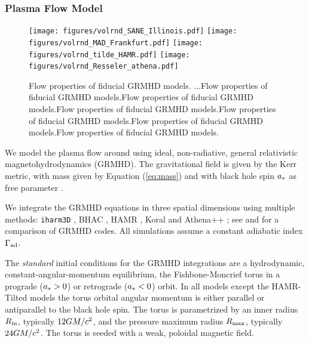 \subsubsection{Plasma Flow Model}

\begin{figure}
  \centering
  \texttt{[image: figures/volrnd\_SANE\_Illinois.pdf]}%
  \texttt{[image: figures/volrnd\_MAD\_Frankfurt.pdf]}%
  \texttt{[image: figures/volrnd\_tilde\_HAMR.pdf]}%
  \texttt{[image: figures/volrnd\_Resseler\_athena.pdf]}\\
  \caption{Flow properties of fiducial GRMHD models.
    ...Flow properties of fiducial GRMHD models.Flow properties of fiducial GRMHD models.Flow properties of fiducial GRMHD models.Flow properties of fiducial GRMHD models.Flow properties of fiducial GRMHD models.Flow properties of fiducial GRMHD models.}
  \label{fig:GRMHD}
\end{figure}

We model the plasma flow around \sgra using ideal, non-radiative, general relativistic magnetohydrodynamics (GRMHD).  The gravitational field is given by the Kerr metric, with mass given by Equation (\ref{eq:mass}) and with black hole spin $a_*$ as free parameter \citep[see e.g.,][]{2003ApJ...589..444G, 2005ApJ...635..723A, 2007A&A...473...11D}.

We integrate the GRMHD equations in three spatial dimensions using multiple methods: {\tt iharm3D} \citep{2021JOSS....6.3336P}, BHAC \citep{2017ComAC...4....1P}, HAMR \citep{2018MNRAS.474L..81L}, Koral \citep{2013MNRAS.429.3533S} and Athena++ \citep{2016ApJS..225...22W}; see \citealt{2019ApJS..243...26P} and \citet[in prep]{Olivares_et_al} for a comparison of GRMHD codes.  All simulations assume a constant adiabatic index $\Gamma_{\rm ad}$.

The \emph{standard} initial conditions for the GRMHD integrations are a hydrodynamic, constant-angular-momentum equilibrium, the Fishbone-Moncrief torus \citep{1976ApJ...207..962F} in a prograde ($a_* > 0$) or retrograde ($a_* < 0$) orbit.  In all models except the HAMR-Tilted models the torus orbital angular momentum is either parallel or antiparallel to the black hole spin. The torus is parametrized by an inner radius $R_{\rm in}$, typically $12GM/c^2$, and the pressure maximum radius $R_{\rm max}$, typically $24GM/c^2$.
The torus is seeded with a weak, poloidal magnetic field.


